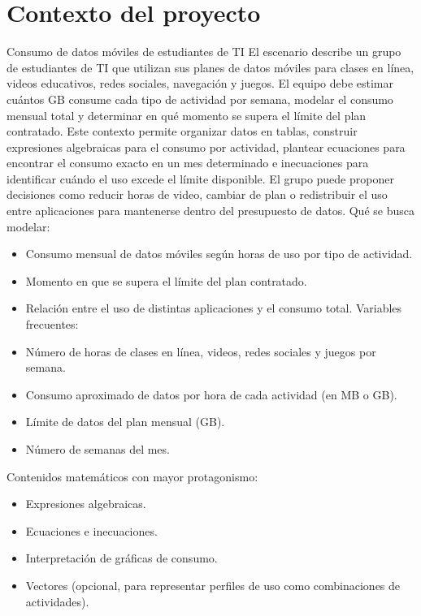 \documentclass[12pt,a4paper]{article}
\begin{document}
\begin{center}
\begin{itemize}
		\end{itemize}
		
		\section{Contexto del proyecto}
		
		Consumo de datos móviles de estudiantes de TI El escenario describe un grupo de estudiantes de TI que utilizan sus planes de datos móviles para clases en línea, videos educativos, redes sociales, navegación y juegos. El equipo debe estimar cuántos GB consume cada tipo de actividad por semana, modelar el consumo mensual total y determinar en qué momento se supera el límite del plan contratado. Este contexto permite organizar datos en tablas, construir expresiones algebraicas para el consumo por actividad, plantear ecuaciones para encontrar el consumo exacto en un mes determinado e inecuaciones para identificar cuándo el uso excede el límite disponible. El grupo puede proponer decisiones como reducir horas de video, cambiar de plan o redistribuir el uso entre aplicaciones para mantenerse dentro del presupuesto de datos. Qué se busca modelar: 
		
		\begin{itemize}
			\item  Consumo mensual de datos móviles según horas de uso por tipo de actividad.
			\item Momento en que se supera el límite del plan contratado.
			\item Relación entre el uso de distintas aplicaciones y el consumo total. Variables frecuentes:
			\item Número de horas de clases en línea, videos, redes sociales y juegos por semana.
			\item Consumo aproximado de datos por hora de cada actividad (en MB o GB).
			\item Límite de datos del plan mensual (GB).
			\item Número de semanas del mes.
		\end{itemize}
		Contenidos matemáticos con mayor protagonismo:
		\begin{itemize}
			\item Expresiones algebraicas.
			\item Ecuaciones e inecuaciones.
			\item Interpretación de gráficas de consumo.
			\item Vectores (opcional, para representar perfiles de uso como combinaciones de actividades).
		\end{itemize}
		

\end{center}
\end{document}

